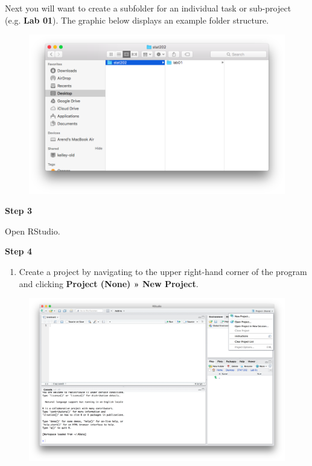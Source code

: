 \documentclass[]{book}
\providecommand{\tightlist}{%
  \setlength{\itemsep}{0pt}\setlength{\parskip}{0pt}}
\theoremstyle{definition}
\theoremstyle{definition}
\theoremstyle{definition}
\theoremstyle{remark}
\begin{document}
Next you will want to create a subfolder for an individual task or
sub-project (e.g. \textbf{Lab 01}). The graphic below displays an
example folder structure.

\begin{figure}
\centering
\includegraphics{./assets/images/01-01.png}
\caption{}
\end{figure}

\textbf{Step 3}

Open RStudio.

\textbf{Step 4}

\begin{enumerate}
\def\labelenumi{\arabic{enumi}.}
\setcounter{enumi}{3}
\tightlist
\item
  Create a project by navigating to the upper right-hand corner of the
  program and clicking \textbf{Project (None) » New Project}.
\end{enumerate}

\begin{figure}
\centering
\includegraphics{./assets/images/01-02.png}
\caption{}
\end{figure}
\end{document}
